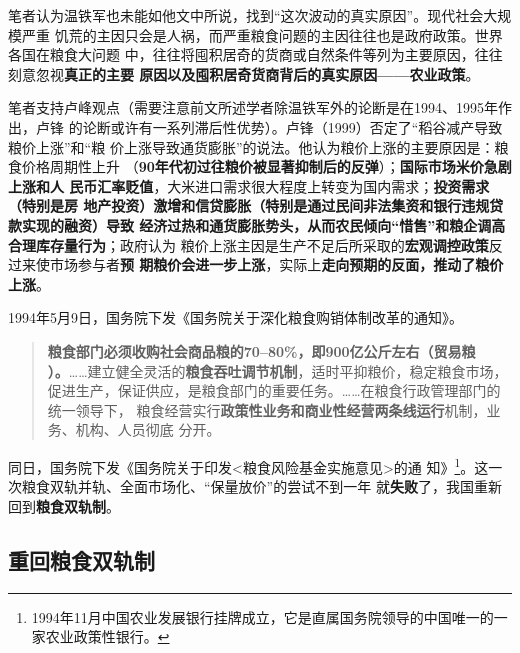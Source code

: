 笔者认为温铁军也未能如他文中所说，找到“这次波动的真实原因”。现代社会大规模严重
饥荒的主因只会是人祸，而严重粮食问题的主因往往也是政府政策。世界各国在粮食大问题
中，往往将囤积居奇的货商或自然条件等列为主要原因，往往刻意忽视\textbf{真正的主要
  原因以及囤积居奇货商背后的真实原因——农业政策}。

笔者支持卢峰观点（需要注意前文所述学者除温铁军外的论断是在1994、1995年作出，卢锋
的论断或许有一系列滞后性优势）。卢锋（1999）否定了“稻谷减产导致粮价上涨”和“粮
价上涨导致通货膨胀”的说法。他认为粮价上涨的主要原因是：粮食价格周期性上升
（\textbf{90年代初过往粮价被显著抑制后的反弹}）；\textbf{国际市场米价急剧上涨和人
  民币汇率贬值}，大米进口需求很大程度上转变为国内需求；\textbf{投资需求（特别是房
  地产投资）激增和信贷膨胀（特别是通过民间非法集资和银行违规贷款实现的融资）导致
  经济过热和通货膨胀势头，从而农民倾向“惜售”和粮企调高合理库存量行为}；政府认为
粮价上涨主因是生产不足后所采取的\textbf{宏观调控政策}反过来使市场参与者\textbf{预
  期粮价会进一步上涨}，实际上\textbf{走向预期的反面，推动了粮价上涨}。

1994年5月9日，国务院下发《国务院关于深化粮食购销体制改革的通知》。
\begin{quotation}
  \textbf{粮食部门必须收购社会商品粮的70--80\%，即900亿公斤左右（贸易粮
    ）。}……建立健全灵活的\textbf{粮食吞吐调节机制}，适时平抑粮价，稳定粮食市场，
  促进生产，保证供应，是粮食部门的重要任务。……在粮食行政管理部门的统一领导下，
  粮食经营实行\textbf{政策性业务和商业性经营两条线运行}机制，业务、机构、人员彻底
  分开。
\end{quotation}

同日，国务院下发《国务院关于印发<粮食风险基金实施意见>的通
知》\footnote{1994年11月中国农业发展银行挂牌成立，它是直属国务院领导的中国唯一的一
  家农业政策性银行。}。这一次粮食双轨并轨、全面市场化、“保量放价”的尝试不到一年
就\textbf{失败}了，我国重新回到\textbf{粮食双轨制}。


\subsection{重回粮食双轨制}

